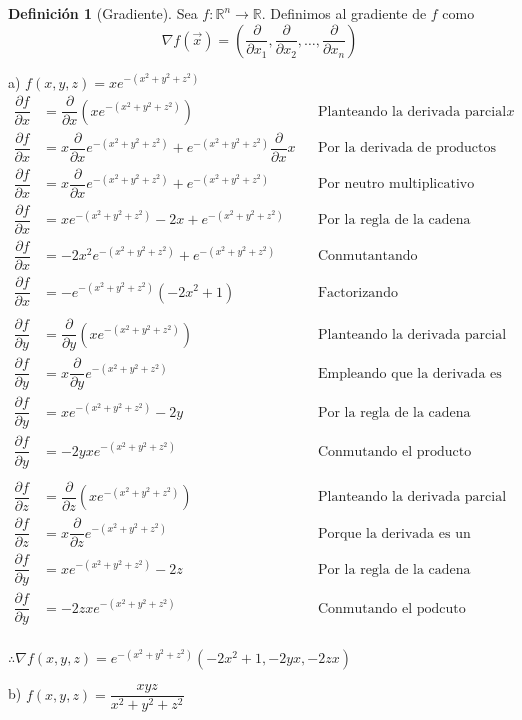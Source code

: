 \documentclass[letterpaper]{article}
\renewcommand{\d}{\partial}
\newcommand{\R}{\mathds{R}}
\renewcommand{\*}{\cdot}
\theoremstyle{definition}
\newtheorem{definition}{Definición}
\begin{document}
\begin{definition}[Gradiente]
	Sea $ f: \R^n \to \R $.
	Definimos al gradiente de $ f $ como 
	\[ \nabla f(\vec{x}) = \left( \dfrac{\d}{\d x_1}, \dfrac{\d}{\d x_2}, \dots, \dfrac{\d}{\d x_n}  \right) \]
\end{definition}
\noindent a) $f(x,y,z) = x e^{-(x^2 +y^2 +z^2)}$
\begin{align*}
	\dfrac{\d f}{\d x} &= \dfrac{\d}{\d x} (x e^{-(x^2 +y^2 +z^2)}) && \text{Planteando la derivada parcial con respecto a } x\\
	\dfrac{\d f}{\d x} &= x\dfrac{\d}{\d x} e^{-(x^2 +y^2 +z^2)} + e^{-(x^2 +y^2 +z^2)} \dfrac{\d}{\d x} x && \text{Por la derivada de productos }\\
	\dfrac{\d f}{\d x} &= x\dfrac{\d}{\d x} e^{-(x^2 +y^2 +z^2)} + e^{-(x^2 +y^2 +z^2)} && \text{Por neutro multiplicativo }\\
	\dfrac{\d f}{\d x} &= xe^{-(x^2 +y^2 +z^2)}-2x + e^{-(x^2 +y^2 +z^2)} && \text{Por la regla de la cadena }\\
	\dfrac{\d f}{\d x} &= -2x^2e^{-(x^2 +y^2 +z^2)} + e^{-(x^2 +y^2 +z^2)} && \text{Conmutantando }\\
	\dfrac{\d f}{\d x} &= -e^{-(x^2 +y^2 +z^2)}(-2x^2 +1) && \text{Factorizando  }\\
	\\
	\dfrac{\d f}{\d y} &= \dfrac{\d}{\d y}(x e^{-(x^2 +y^2 +z^2)}) && \text{Planteando la derivada parcial}\\
	\dfrac{\d f}{\d y} &= x\dfrac{\d}{\d y}e^{-(x^2 +y^2 +z^2)} && \text{Empleando que la derivada es lineal}\\
	\dfrac{\d f}{\d y} &= xe^{-(x^2 +y^2 +z^2)}-2y && \text{Por la regla de la cadena}\\
	\dfrac{\d f}{\d y} &= -2yxe^{-(x^2 +y^2 +z^2)} && \text{Conmutando el producto}\\
	\\
	\dfrac{\d f}{\d z} &= \dfrac{\d}{\d z} (x e^{-(x^2 +y^2 +z^2)}) && \text{Planteando la derivada parcial}\\
	\dfrac{\d f}{\d z} &= x\dfrac{\d}{\d z} e^{-(x^2 +y^2 +z^2)} && \text{Porque la derivada es un operador lineal}\\
	\dfrac{\d f}{\d y} &= xe^{-(x^2 +y^2 +z^2)}-2z && \text{Por la regla de la cadena}\\
	\dfrac{\d f}{\d y} &= -2zxe^{-(x^2 +y^2 +z^2)} && \text{Conmutando el podcuto}\\
\end{align*}
\begin{center}
	$ \therefore \nabla f(x,y,z) = e^{-(x^2 +y^2 +z^2)} ( -2x^2 +1, -2yx, -2zx ) $
\end{center}
\noindent b) $f(x,y,z) = \dfrac{xyz}{x^2 +y^2 +z^2}$\\
\end{document}
